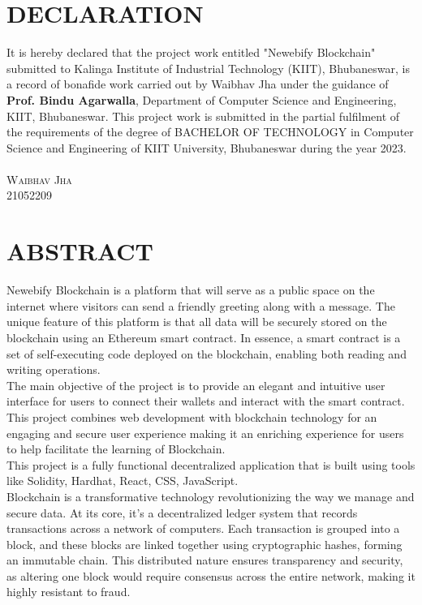\documentclass[12pt,a4paper]{article}
\begin{document}
\section*{\huge DECLARATION}

It is hereby declared that the project work entitled "Newebify Blockchain" submitted to Kalinga Institute of Industrial Technology (KIIT), Bhubaneswar, is a record of bonafide work carried out by Waibhav Jha under the guidance of \textbf{Prof. Bindu Agarwalla}, Department of Computer Science and Engineering, KIIT, Bhubaneswar. This project work is submitted in the partial fulfilment of the requirements of the degree of BACHELOR OF TECHNOLOGY in Computer Science and Engineering of KIIT University, Bhubaneswar during the year 2023.\\
\\
\textsc{\large Waibhav Jha\\21052209}

\newpage
\linespread{1.6}
\section*{\huge ABSTRACT}

Newebify Blockchain is a platform that will serve as a public space on the internet where visitors can send a friendly greeting along with a message. The unique feature of this platform is that all data will be securely stored on the blockchain using an Ethereum smart contract. In essence, a smart contract is a set of self-executing code deployed on the blockchain, enabling both reading and writing operations.
\cite{blockchain}\\

The main objective of the project is to provide an elegant and intuitive user interface for users to connect their wallets and interact with the smart contract. This project combines web development with blockchain technology for an engaging and secure user experience making it an enriching experience for users to help facilitate the learning of Blockchain.\\

This project is a fully functional decentralized application that is built using tools like Solidity, Hardhat, React, CSS, JavaScript.\\

Blockchain is a transformative technology revolutionizing the way we manage and secure data. At its core, it's a decentralized ledger system that records transactions across a network of computers. Each transaction is grouped into a block, and these blocks are linked together using cryptographic hashes, forming an immutable chain. This distributed nature ensures transparency and security, as altering one block would require consensus across the entire network, making it highly resistant to fraud.\cite{blockchain}\\
\end{document}

